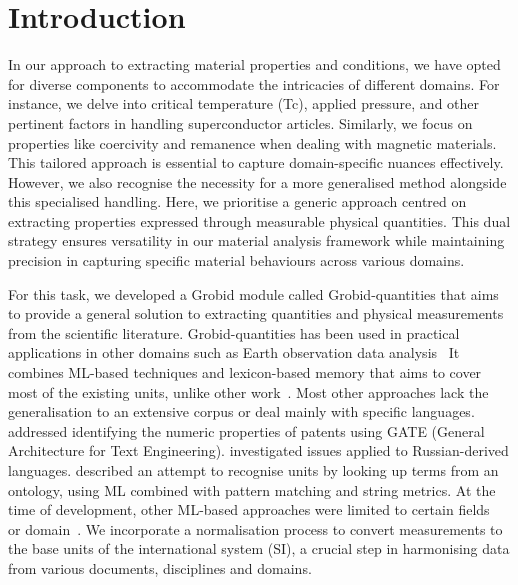 \section{Introduction}

In our approach to extracting material properties and conditions, we have opted for diverse components to accommodate the intricacies of different domains. 
For instance, we delve into critical temperature (Tc), applied pressure, and other pertinent factors in handling superconductor articles. 
Similarly, we focus on properties like coercivity and remanence when dealing with magnetic materials. 
This tailored approach is essential to capture domain-specific nuances effectively. However, we also recognise the necessity for a more generalised method alongside this specialised handling. Here, we prioritise a generic approach centred on extracting properties expressed through measurable physical quantities. This dual strategy ensures versatility in our material analysis framework while maintaining precision in capturing specific material behaviours across various domains.

For this task, we developed a Grobid module called Grobid-quantities that aims to provide a general solution to extracting quantities and physical measurements from the scientific literature. 
Grobid-quantities has been used in practical applications in other domains such as Earth observation data analysis~\cite{hundman2017measurement} 
It combines ML-based techniques and lexicon-based memory that aims to cover most of the existing units, unlike other work~\cite{aras2014applications}. 
Most other approaches lack the generalisation to an extensive corpus or deal mainly with specific languages. 
\cite{agatonovic2008large} addressed identifying the numeric properties of patents using GATE (General Architecture for Text Engineering). 
\cite{am2013processing} investigated issues applied to Russian-derived languages. \cite{berrahou2013extract} described an attempt to recognise units by looking up terms from an ontology, using ML combined with pattern matching and string metrics. 
At the time of development, other ML-based approaches were limited to certain fields~\cite{dieb2015framework} or domain~\cite{kang_extracting_2013}.
We incorporate a normalisation process to convert measurements to the base units of the international system (SI), a crucial step in harmonising data from various documents, disciplines and domains.

